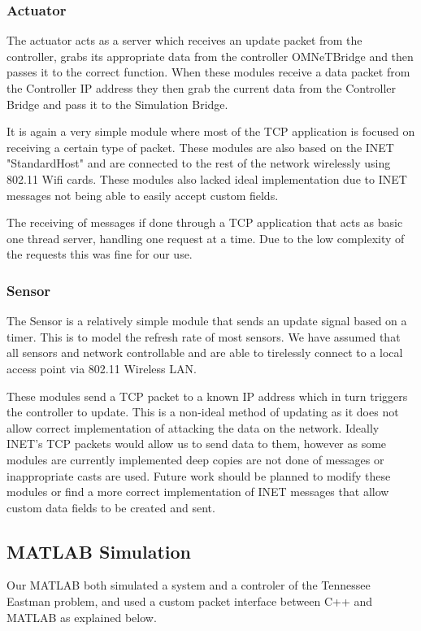 \subsubsection{Actuator}

The actuator acts as a server which receives an update packet from the controller, grabs its 
appropriate data from the controller OMNeTBridge and then passes it to the correct function. 
When these modules receive a data packet from the Controller IP address they then grab the current data from the Controller Bridge and pass it to the Simulation Bridge. 

It is again a very simple module where most of the TCP application is focused on receiving a certain type of packet. These modules are also based on the INET "StandardHost" and are connected to the rest of the network wirelessly using 802.11 Wifi cards. These modules also lacked ideal implementation due to INET messages not being able to easily accept custom fields.  

The receiving of messages if done through a TCP application that acts as basic one thread server, handling one request at a time. Due to the low complexity of the requests this was fine for our use. 


\subsubsection{Sensor}

The Sensor is a relatively simple module that sends an update signal based on a timer. This 
is to model the refresh rate of most sensors. We have assumed that all sensors and network 
controllable and are able to tirelessly connect to a local access point via 802.11 Wireless 
LAN. 

These modules send a TCP packet to a known IP address which in turn triggers the controller 
to update. This is a non-ideal method of updating as it does not allow correct implementation 
of attacking the data on the network. Ideally INET's TCP packets would allow us to send data 
to them, however as some modules are currently implemented deep copies are not done of 
messages or inappropriate casts are used. Future work should be planned to modify these 
modules or find a more correct implementation of INET messages that allow custom data fields 
to be created and sent. 

\subsection{MATLAB Simulation}
  Our MATLAB both simulated a system and a controler of the
  Tennessee Eastman problem, and used a custom packet interface
  between C++ and MATLAB as explained below.

